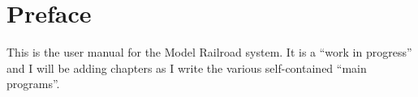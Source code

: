 
\chapter*{Preface}
%
\label{chpt:Preface}

This is the user manual for the Model Railroad system.  It is a ``work
in progress'' and I will be adding chapters as I write the various
self-contained ``main programs''.
